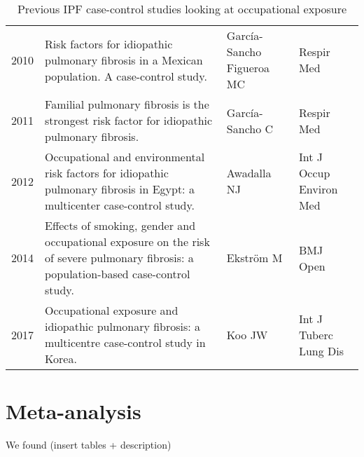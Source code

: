 \documentclass[a4paper,12pt]{article}
\begin{document}
\begin{table}
\begin{tabular}{lp{6cm}p{3cm}p{5cm}}
            2010    &                                            Risk factors for idiopathic pulmonary fibrosis in a Mexican population. A case-control study. &  García-Sancho Figueroa MC &                  Respir Med \\
            2011    &                                              Familial pulmonary fibrosis is the strongest risk factor for idiopathic pulmonary fibrosis. &            García-Sancho C &                  Respir Med \\
            2012    &                Occupational and environmental risk factors for idiopathic pulmonary fibrosis in Egypt: a multicenter case-control study. &                Awadalla NJ &     Int J Occup Environ Med \\
            2014    &    Effects of smoking, gender and occupational exposure on the risk of severe pulmonary fibrosis: a population-based case-control study. &                  Ekström M &                    BMJ Open \\
            2017    &                                      Occupational exposure and idiopathic pulmonary fibrosis: a multicentre case-control study in Korea. &                     Koo JW &       Int J Tuberc Lung Dis \\
    \bottomrule
    \end{tabular}
\caption{Previous IPF case-control studies looking at occupational exposure}
\label{table:papers}
\end{table}
                 
\section{Meta-analysis}
We found (insert tables + description)

\clearpage

\makeatletter
 \def\@biblabel#1{#1}
\makeatother



\end{document}
